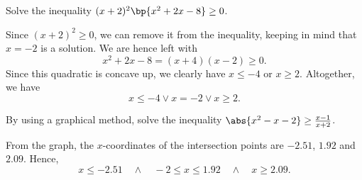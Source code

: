 \begin{problem}
    Solve the inequality $(x + 2)^2 \bp{x^2 + 2x - 8} \geq 0$.
\end{problem}
\begin{solution}
    Since $(x+2)^2 \geq 0$, we can remove it from the inequality, keeping in mind that $x = -2$ is a solution. We are hence left with \[x^2 + 2x - 8 = (x+4)(x-2) \geq 0.\] Since this quadratic is concave up, we clearly have $x \leq -4$ or $x \geq 2$. Altogether, we have \[x \leq -4 \lor x = -2 \lor x \geq 2.\]
\end{solution}

\begin{problem}
    By using a graphical method, solve the inequality $\abs{x^2 - x - 2} \geq \frac{x-1}{x+2}$.
\end{problem}
\begin{solution}
    \begin{figure}[H]
    \centering
    \end{figure}

    From the graph, the $x$-coordinates of the intersection points are $-2.51$, $1.92$ and $2.09$. Hence, \[x \leq -2.51 \quad \land \quad -2 \leq x \leq 1.92 \quad \land \quad x \geq 2.09.\]
\end{solution}

